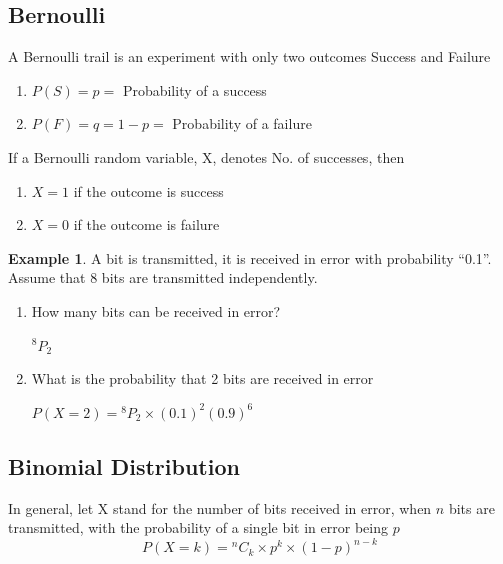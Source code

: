 \documentclass[12pt]{article}
\theoremstyle{definition}
\newtheorem{exmp}{Example}[section]
\newcommand*{\Perm}[2]{{}^{#1}\!P_{#2}}%
\newcommand*{\Comb}[2]{{}^{#1}C_{#2}}%
\begin{document}
\subsection{Bernoulli}
A Bernoulli trail is an experiment with only two outcomes Success and Failure 
\begin{enumerate}
    \item $P(S) = p = $ Probability of a success
    \item $P(F) = q = 1 - p = $ Probability of a failure
\end{enumerate}
If a Bernoulli random variable, X, denotes No. of successes, then
\begin{enumerate}
    \item $ X = 1$ if the outcome is success
    \item $ X = 0$ if the outcome is failure
\end{enumerate}
\begin{exmp}
A bit is transmitted, it is received in error with probability “0.1”.\\
Assume that 8 bits are transmitted independently.
\begin{enumerate}
    \item How many bits can be received in error?
        \begin{center}
            $\Perm{8}{2}$
        \end{center}   
    \item What is the probability that 2 bits are received in error
        \begin{center}
            $P(X=2) = \Perm{8}{2} \times (0.1)^2 (0.9)^6  $  
        \end{center}   
\end{enumerate}
\end{exmp}    
\subsection{Binomial Distribution}
In general, let X stand for the number of bits received in error, when $n$ bits are transmitted,
with the probability of a single bit in error being $p$
\begin{equation}
    P (X = k) = \Comb{n}{k} \times p^k \times (1-p)^{n - k} 
\end{equation}    
\end{document}
